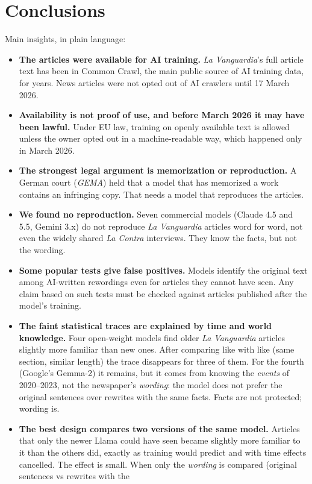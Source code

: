 \documentclass[10pt,a4paper]{article}
\begin{document}
\section{Conclusions}
Main insights, in plain language:
\begin{itemize}
\item \textbf{The articles were available for AI training.} \emph{La Vanguardia}'s full article text has been in
Common Crawl, the main public source of AI training data, for years. News articles were not opted out of AI crawlers
until 17 March 2026.
\item \textbf{Availability is not proof of use, and before March 2026 it may have been lawful.} Under EU law, training
on openly available text is allowed unless the owner opted out in a machine-readable way, which happened only in
March 2026.
\item \textbf{The strongest legal argument is memorization or reproduction.} A German court (\emph{GEMA}) held that a
model that has memorized a work contains an infringing copy. That needs a model that reproduces the articles.
\item \textbf{We found no reproduction.} Seven commercial models (Claude 4.5 and 5.5, Gemini 3.x) do not reproduce
\emph{La Vanguardia} articles word for word, not even the widely shared \emph{La Contra} interviews. They know the
facts, but not the wording.
\item \textbf{Some popular tests give false positives.} Models identify the original text among AI-written rewordings
even for articles they cannot have seen. Any claim based on such tests must be checked against articles published
after the model's training.
\item \textbf{The faint statistical traces are explained by time and world knowledge.} Four open-weight models find
older \emph{La Vanguardia} articles slightly more familiar than new ones. After comparing like with like (same
section, similar length) the trace disappears for three of them. For the fourth (Google's Gemma-2) it remains, but it
comes from knowing the \emph{events} of 2020--2023, not the newspaper's \emph{wording}: the model does not prefer the
original sentences over rewrites with the same facts. Facts are not protected; wording is.
\item \textbf{The best design compares two versions of the same model.} Articles that only the newer Llama could have
seen became slightly more familiar to it than the others did, exactly as training would predict and with time effects
cancelled. The effect is small. When only the \emph{wording} is compared (original sentences vs rewrites with the

\end{itemize}
\end{document}
